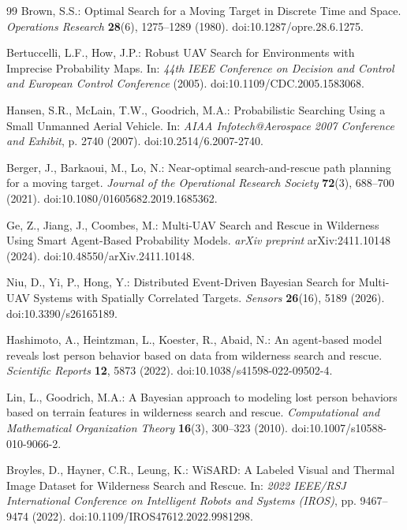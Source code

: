 \documentclass[12pt,a4paper]{article}
\begin{document}
\begin{thebibliography}{99}
Brown, S.S.:
Optimal Search for a Moving Target in Discrete Time and Space.
\emph{Operations Research} \textbf{28}(6), 1275--1289 (1980).
doi:10.1287/opre.28.6.1275.

Bertuccelli, L.F., How, J.P.:
Robust UAV Search for Environments with Imprecise Probability Maps.
In: \emph{44th IEEE Conference on Decision and Control and European Control Conference} (2005).
doi:10.1109/CDC.2005.1583068.

Hansen, S.R., McLain, T.W., Goodrich, M.A.:
Probabilistic Searching Using a Small Unmanned Aerial Vehicle.
In: \emph{AIAA Infotech@Aerospace 2007 Conference and Exhibit}, p. 2740 (2007).
doi:10.2514/6.2007-2740.

Berger, J., Barkaoui, M., Lo, N.:
Near-optimal search-and-rescue path planning for a moving target.
\emph{Journal of the Operational Research Society} \textbf{72}(3), 688--700 (2021).
doi:10.1080/01605682.2019.1685362.

Ge, Z., Jiang, J., Coombes, M.:
Multi-UAV Search and Rescue in Wilderness Using Smart Agent-Based Probability Models.
\emph{arXiv preprint} arXiv:2411.10148 (2024).
doi:10.48550/arXiv.2411.10148.

Niu, D., Yi, P., Hong, Y.:
Distributed Event-Driven Bayesian Search for Multi-UAV Systems with Spatially Correlated Targets.
\emph{Sensors} \textbf{26}(16), 5189 (2026).
doi:10.3390/s26165189.

Hashimoto, A., Heintzman, L., Koester, R., Abaid, N.:
An agent-based model reveals lost person behavior based on data from wilderness search and rescue.
\emph{Scientific Reports} \textbf{12}, 5873 (2022).
doi:10.1038/s41598-022-09502-4.

Lin, L., Goodrich, M.A.:
A Bayesian approach to modeling lost person behaviors based on terrain features in wilderness search and rescue.
\emph{Computational and Mathematical Organization Theory} \textbf{16}(3), 300--323 (2010).
doi:10.1007/s10588-010-9066-2.

Broyles, D., Hayner, C.R., Leung, K.:
WiSARD: A Labeled Visual and Thermal Image Dataset for Wilderness Search and Rescue.
In: \emph{2022 IEEE/RSJ International Conference on Intelligent Robots and Systems (IROS)}, pp. 9467--9474 (2022).
doi:10.1109/IROS47612.2022.9981298.


\end{thebibliography}
\end{document}
